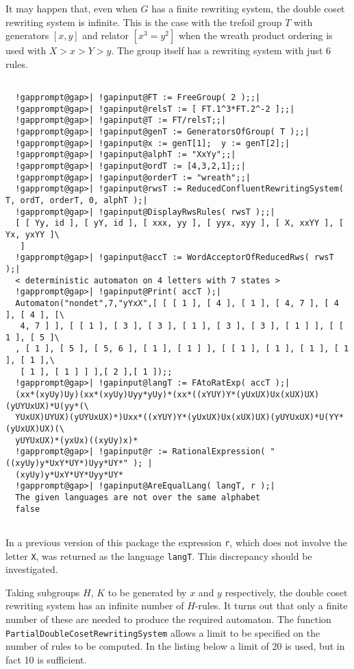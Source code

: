 \documentclass[a4paper,11pt]{report}
\begin{document}
{{{ It may happen that, even when $G$ has a finite rewriting system, the double coset rewriting system is infinite.
This is the case with the trefoil group $T$ with generators $[x,y]$ and relator $[x^3 = y^2]$ when the wreath product ordering is used with $X > x > Y > y$. The group itself has a rewriting system with just 6 rules. }

 
\begin{Verbatim}[commandchars=!@|,fontsize=\small,frame=single,label=Example]
  
  !gapprompt@gap>| !gapinput@FT := FreeGroup( 2 );;|
  !gapprompt@gap>| !gapinput@relsT := [ FT.1^3*FT.2^-2 ];;|
  !gapprompt@gap>| !gapinput@T := FT/relsT;;|
  !gapprompt@gap>| !gapinput@genT := GeneratorsOfGroup( T );;|
  !gapprompt@gap>| !gapinput@x := genT[1];  y := genT[2];|
  !gapprompt@gap>| !gapinput@alphT := "XxYy";;|
  !gapprompt@gap>| !gapinput@ordT := [4,3,2,1];;|
  !gapprompt@gap>| !gapinput@orderT := "wreath";;|
  !gapprompt@gap>| !gapinput@rwsT := ReducedConfluentRewritingSystem( T, ordT, orderT, 0, alphT );|
  !gapprompt@gap>| !gapinput@DisplayRwsRules( rwsT );;|
  [ [ Yy, id ], [ yY, id ], [ xxx, yy ], [ yyx, xyy ], [ X, xxYY ], [ Yx, yxYY ]\
   ]
  !gapprompt@gap>| !gapinput@accT := WordAcceptorOfReducedRws( rwsT );|
  < deterministic automaton on 4 letters with 7 states >
  !gapprompt@gap>| !gapinput@Print( accT );|
  Automaton("nondet",7,"yYxX",[ [ [ 1 ], [ 4 ], [ 1 ], [ 4, 7 ], [ 4 ], [ 4 ], [\
   4, 7 ] ], [ [ 1 ], [ 3 ], [ 3 ], [ 1 ], [ 3 ], [ 3 ], [ 1 ] ], [ [ 1 ], [ 5 ]\
  , [ 1 ], [ 5 ], [ 5, 6 ], [ 1 ], [ 1 ] ], [ [ 1 ], [ 1 ], [ 1 ], [ 1 ], [ 1 ],\
   [ 1 ], [ 1 ] ] ],[ 2 ],[ 1 ]);;
  !gapprompt@gap>| !gapinput@langT := FAtoRatExp( accT );|
  (xx*(xyUy)Uy)(xx*(xyUy)Uyy*yUy)*(xx*((xYUY)Y*(yUxUX)Ux(xUX)UX)(yUYUxUX)*U(yy*(\
  YUxUX)UYUX)(yUYUxUX)*)Uxx*((xYUY)Y*(yUxUX)Ux(xUX)UX)(yUYUxUX)*U(YY*(yUxUX)UX)(\
  yUYUxUX)*(yxUx)((xyUy)x)*
  !gapprompt@gap>| !gapinput@r := RationalExpression( "((xyUy)y*UxY*UY*)Uyy*UY*" ); |
  (xyUy)y*UxY*UY*Uyy*UY*
  !gapprompt@gap>| !gapinput@AreEqualLang( langT, r );|
  The given languages are not over the same alphabet
  false
  
\end{Verbatim}
 In a previous version of this package the expression \texttt{r}, which does not involve the letter \texttt{X}, was returned as the language \texttt{langT}. This discrepancy should be investigated. 

 Taking subgroups $H$, $K$ to be generated by $x$ and $y$ respectively, the double coset rewriting system has an infinite number of $H$-rules. It turns out that only a finite number of these are needed to produce
the required automaton. The function \texttt{PartialDoubleCosetRewritingSystem} allows a limit to be specified on the number of rules to be computed. In the
listing below a limit of 20 is used, but in fact 10 is sufficient. 
\begin{Verbatim}[commandchars=!@|,fontsize=\small,frame=single,label=Example]
  

\end{Verbatim}}}
\end{document}
